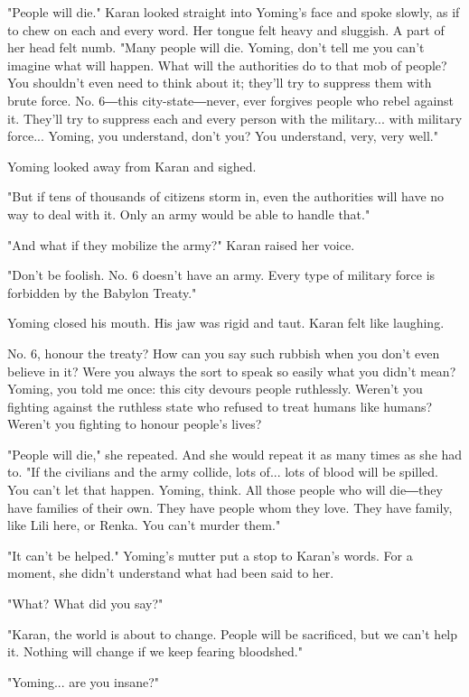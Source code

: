"People will die." Karan looked straight into Yoming's face and spoke
slowly, as if to chew on each and every word. Her tongue felt heavy and
sluggish. A part of her head felt numb. "Many people will die. Yoming,
don't tell me you can't imagine what will happen. What will the
authorities do to that mob of people? You shouldn't even need to think
about it; they'll try to suppress them with brute force. No. 6―this
city-state―never, ever forgives people who rebel against it. They'll try
to suppress each and every person with the military... with military
force... Yoming, you understand, don't you? You understand, very, very
well."

Yoming looked away from Karan and sighed.

"But if tens of thousands of citizens storm in, even the authorities
will have no way to deal with it. Only an army would be able to handle
that."

"And what if they mobilize the army?" Karan raised her voice.

"Don't be foolish. No. 6 doesn't have an army. Every type of military
force is forbidden by the Babylon Treaty."

Yoming closed his mouth. His jaw was rigid and taut. Karan felt like
laughing.

No. 6, honour the treaty? How can you say such rubbish when you don't
even believe in it? Were you always the sort to speak so easily what you
didn't mean? Yoming, you told me once: this city devours people
ruthlessly. Weren't you fighting against the ruthless state who refused
to treat humans like humans? Weren't you fighting to honour people's
lives?

"People will die," she repeated. And she would repeat it as many times
as she had to. "If the civilians and the army collide, lots of... lots
of blood will be spilled. You can't let that happen. Yoming, think. All
those people who will die―they have families of their own. They have
people whom they love. They have family, like Lili here, or Renka. You
can't murder them."

"It can't be helped." Yoming's mutter put a stop to Karan's words. For a
moment, she didn't understand what had been said to her.

"What? What did you say?"

"Karan, the world is about to change. People will be sacrificed, but we
can't help it. Nothing will change if we keep fearing bloodshed."

"Yoming... are you insane?"

